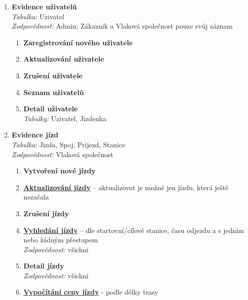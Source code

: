 \documentclass[11pt]{article}
\begin{document}
\begin{enumerate}
    \item \textbf{Evidence uživatelů}\\
        \textit{Tabulka:} Uzivatel\\
        \textit{Zodpovědnost:} Admin; Zákazník a Vlaková společnost pouze svůj záznam
        \begin{enumerate}
            \item \textbf{Zaregistrování nového uživatele}
            \item \textbf{Aktualizování uživatele}
            \item \textbf{Zrušení uživatele}
            \item \textbf{Seznam uživatelů}
            \item \textbf{Detail uživatele}\\
            \textit{Tabulky:} Uzivatel, Jizdenka
        \end{enumerate}

    \item \textbf{Evidence jízd}\\
        \textit{Tabulka:} Jizda, Spoj, Prijezd, Stanice\\
        \textit{Zodpovědnost:} Vlaková společnost
        \begin{enumerate}
            \item \textbf{Vytvoření nové jízdy}
            \item \underline{\textbf{Aktualizování jízdy}} – aktualizovat je možné jen jízdu, která ještě nezačala
            \item \textbf{Zrušení jízdy}
            \item \underline{\textbf{Vyhledání jízdy}} – dle startovní/cílové stanice, času odjezdu a s jedním nebo žádným přestupem\\
            \textit{Zodpovědnost:} všichni
            \item \textbf{Detail jízdy}\\
            \textit{Zodpovědnost:} všichni
            \item \underline{\textbf{Vypočítání ceny jízdy}} - podle délky trasy
        \end{enumerate}


\end{enumerate}
\end{document}
